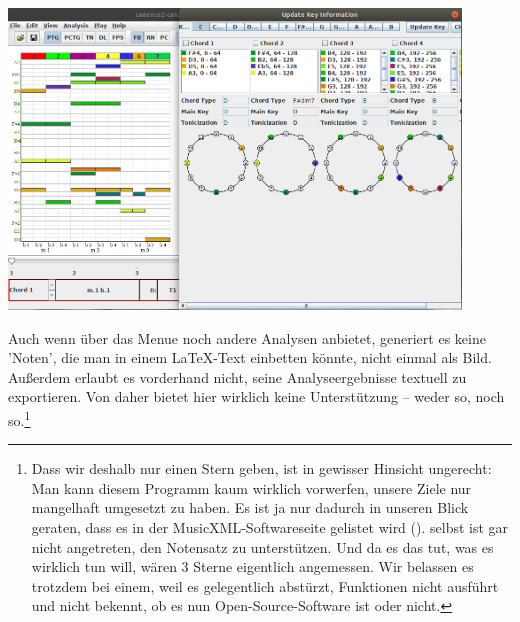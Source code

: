 \begin{center}
\includegraphics[width=0.9\textwidth]{frontends/ptolemaic/ptolemaic-2-win-300dpi.png}
\end{center}

Auch wenn  über das Menue noch andere Analysen anbietet,
generiert es keine 'Noten', die man in einem \LaTeX-Text einbetten könnte, nicht
einmal als Bild. Außerdem erlaubt es vorderhand nicht, seine Analyseergebnisse
textuell zu exportieren. Von daher bietet  hier wirklich keine
Unterstützung -- weder so, noch so.\footnote{Dass wir  deshalb
nur einen Stern geben, ist in gewisser Hinsicht ungerecht: Man kann diesem
Programm kaum wirklich vorwerfen, unsere Ziele nur mangelhaft umgesetzt zu
haben. Es ist ja nur dadurch in unseren Blick geraten, dass es in der
MusicXML-Softwareseite gelistet wird (\cite[vgl.][\nopage
wp.]{MusicXML2018b}).  selbst ist gar nicht angetreten, den
Notensatz zu unterstützen. Und da es das tut, was es wirklich tun will, wären 3
Sterne eigentlich angemessen. Wir belassen es trotzdem bei einem, weil es
gelegentlich abstürzt, Funktionen nicht ausführt und nicht bekennt, ob es nun
Open-Source-Software ist oder nicht.}

%
